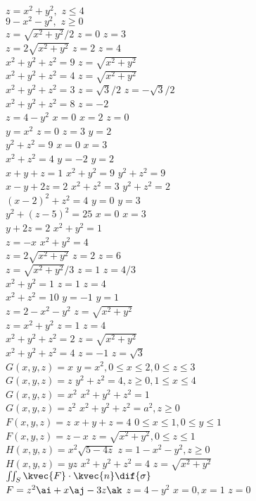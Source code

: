 \(z=x^{2}+y^{2},\,\,z\le4\)\\
\(9-x^{2}-y^{2},\,\,z\ge0\)\\
\(z=\sqrt{x^{2}+y^{2}}/2\)
\(z=0\)
\(z=3\)\\
\(z=2\sqrt{x^{2}+y^{2}}\)
\(z=2\)
\(z=4\)\\
\(x^{2}+y^{2}+z^{2}=9\)
\(z=\sqrt{x^{2}+y^{2}}\)\\
\(x^{2}+y^{2}+z^{2}=4\)
\(z=\sqrt{x^{2}+y^{2}}\)\\
\(x^{2}+y^{2}+z^{2}=3\)
\(z=\sqrt{3}/2\)
\(z=-\sqrt{3}/2\)\\
\(x^{2}+y^{2}+z^{2}=8\)
\(z=-2\)\\
\(z=4-y^{2}\)
\(x=0\)
\(x=2\)
\(z=0\)\\
\(y=x^{2}\)
\(z=0\)
\(z=3\)
\(y=2\)\\
\(y^{2}+z^{2}=9\)
\(x=0\)
\(x=3\)\\
\(x^{2}+z^{2}=4\)
\(y=-2\)
\(y=2\)\\
\(x+y+z=1\)
\(x^{2}+y^{2}=9\)
\(y^{2}+z^{2}=9\)\\
\(x-y+2z=2\)
\(x^{2}+z^{2}=3\)
\(y^{2}+z^{2}=2\)\\
\((x-2)^{2}+z^{2}=4\)
\(y=0\)
\(y=3\)\\
\(y^{2}+(z-5)^{2}=25\)
\(x=0\)
\(x=3\)\\
\(y+2z=2\)
\(x^{2}+y^{2}=1\)\\
\(z=-x\)
\(x^{2}+y^{2}=4\)\\
\(z=2\sqrt{x^{2}+y^{2}}\)
\(z=2\)
\(z=6\)\\
\(z=\sqrt{x^{2}+y^{2}}/3\)
\(z=1\)
\(z=4/3\)\\
\(x^{2}+y^{2}=1\)
\(z=1\)
\(z=4\)\\
\(x^{2}+z^{2}=10\)
\(y=-1\)
\(y=1\)\\
\(z=2-x^{2}-y^{2}\)
\(z=\sqrt{x^{2}+y^{2}}\)\\
\(z=x^{2}+y^{2}\)
\(z=1\)
\(z=4\)\\
\(x^{2}+y^{2}+z^{2}=2\)
\(z=\sqrt{x^{2}+y^{2}}\)\\
\(x^{2}+y^{2}+z^{2}=4\)
\(z=-1\)
\(z=\sqrt{3}\)\\
\(G(x,y,z)=x\)
\(y=x^{2},0\le x\le 2,0\le z\le 3\)\\
\(G(x,y,z)=z\)
\(y^{2}+z^{2}=4,z\ge 0,1\le x\le 4\)\\
\(G(x,y,z)=x^{2}\)
\(x^{2}+y^{2}+z^{2}=1\)\\
\(G(x,y,z)=z^{2}\)
\(x^{2}+y^{2}+z^{2}=a^{2},z\ge 0\)\\
\(F(x,y,z)=z\)
\(x+y+z=4\)
\(0\le x\le 1,0\le y\le 1\)\\
\(F(x,y,z)=z-x\)
\(z=\sqrt{x^{2}+y^{2}},0\le z\le 1\)\\
\(H(x,y,z)=x^{2}\sqrt{5-4z}\)
\(z=1-x^{2}-y^{2},z\ge 0\)\\
\(H(x,y,z)=yz\)
\(x^{2}+y^{2}+z^{2}=4\)
\(z=\sqrt{x^{2}+y^{2}}\)\\
\(\iint_{S}\kvec{F}\cdot\kvec{n}\dif{\sigma}\)\\
\(F=z^{2}\ai+x\aj-3z\ak\)
\(z=4-y^{2}\)
\(x=0,x=1\)
\(z=0\)\\

